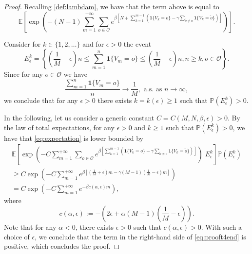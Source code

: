 \documentclass[10pt,a4paper]{amsart}
\def\P{{\mathbb P}}
\newcommand{\opn}{\mathcal{O}}
\begin{document}
\begin{proof}
Recalling \eqref{def:lambdam}, we have that the term above is equal to
\begin{equation} \label{eq:expectation}
\mathbb{E}\left[\exp\left(-(N-1)\sum_{m=1}^{+\infty}\sum_{o\in \opn}e^{\beta [N+\sum_{k=1}^{m-1}(\mathbf{1}\{V_k=o\}-\gamma\sum_{\tilde{o}\neq o}\mathbf{1}\{V_k= \tilde{o}\})]} \right)\right].
\end{equation}

Consider for $k\in \{1,2,\ldots\}$  and for $\epsilon>0$ the event
$$
E_{\epsilon}^{k}=\left\{\left(\frac{1}{M}-\epsilon\right)n \leq \sum_{m=1}^{n}\mathbf{1}\{V_m=o\}\leq \left(\frac{1}{M}+\epsilon\right)n, n\geq k, o\in \opn\right\}.
$$
Since for any $o\in \opn$ we have
$$
\frac{\sum_{m=1}^{n}\mathbf{1}\{V_m=o\}}{n}\to \frac{1}{M}, \text{ a.s. as } n\to \infty,
$$
we conclude that for any $\epsilon>0$ there exists $k=k(\epsilon)\geq 1$ such that
$
\P(E_{\epsilon}^{k})>0.
$

In the following, let us consider a generic constant $C=C(M,N,\beta,\epsilon)>0$.
By the law of total expectations, for any $\epsilon>0$ and $k\geq 1$ such that $\P(E_{\epsilon}^{k})>0$, we have that \eqref{eq:expectation} is lower bounded by
\begin{multline}
\mathbb{E}\left[\exp\left(-C\sum_{m=1}^{+\infty}\sum_{o\in \opn}e^{\beta [\sum_{k=1}^{m-1}(\mathbf{1}\{V_k=o\}-\gamma\sum_{\tilde{o}\neq o}\mathbf{1}\{V_k= \tilde{o}\})]} \right)\Big|E_{\epsilon}^{k}\right]\P(E_{\epsilon}^{k})  \\
\label{eq:prooft4end}
\geq C\exp\left(-C\sum_{m=1}^{+\infty}e^{\beta [(\frac{1}{M}+\epsilon)m-\gamma(M-1)(\frac{1}{M}-\epsilon)m]} \right) \\ = C\exp\left(-C\sum_{m=1}^{+\infty}e^{-\beta c(\alpha,\epsilon)m} \right),
\end{multline}
where
$$
c(\alpha,\epsilon):=-\left(2\epsilon +\alpha(M-1)(\frac{1}{M}-\epsilon)\right).
$$
Note that for any $\alpha<0$, there exists $\epsilon>0$ such that $c(\alpha,\epsilon)>0$.
With such a choice of $\epsilon$, we conclude that
the term in the right-hand side of \eqref{eq:prooft4end} is positive,
which concludes the proof.
\end{proof}
\end{document}
